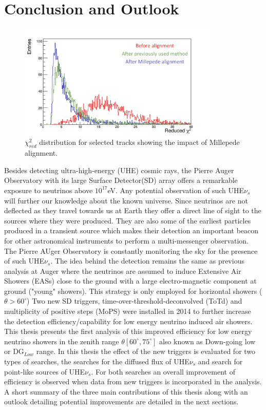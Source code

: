 
\chapter{Conclusion and Outlook}
\label{chap:conc}
\begin{figure}[h!]
\centering
\includegraphics[width=0.85\textwidth]{thesis_figures/chi2_comp_conclusion_2.png}
\caption{$\chi^2_{red}$ distribution for selected tracks showing the impact of Millepede alignment.}
\label{fig:red_chi2_4}
\end{figure}

Besides detecting ultra-high-energy (UHE) cosmic rays, the Pierre Auger Observatory with its large Surface Detector(SD) array offers a remarkable exposure to neutrinos above $10^17$eV. Any potential observation of such UHE$\nu_s$ will further our knowledge about the known universe. Since neutrinos are not deflected as they travel towards us at Earth they offer a direct line of sight to the sources where they were produced. They are also some of the earliest particles produced in a transient source which makes their detection an important beacon for other astronomical instruments to perform a multi-messenger observation. The Pierre AUger Observatory is constantly monitoring the sky for the presence of such UHE$\nu_s$. The idea behind the detection remains the same as previous analysis at Auger where the neutrinos are assumed to induce Extensive Air Showers (EASs) close to the ground with a large electro-magnetic component at ground ("young" showers). This strategy is only employed for horizontal showers ($\theta > 60^{\circ}$) Two new SD triggers, time-over-threshold-deconvolved (ToTd) and multiplicity of positive steps (MoPS) were installed in 2014 to further increase the detection efficiency/capability for low energy neutrino induced air showers. This thesis presents the first analysis of this improved efficiency for low energy neutrino showers in the zenith range $\theta [60^{\circ},75^\circ]$ also known as Down-going low or DG$_{Low}$ range. In this thesis the effect of the new triggers is evaluated for two types of searches, the searches for the diffused flux of UHE$\nu_s$ and search for point-like sources of UHE$\nu_s$. For both searches an overall improvement of efficiency is observed when data from new triggers is incorporated in the analysis. A short summary of the three main contributions of this thesis along with an outlook detailing potential improvements are detailed in the next sections. 
